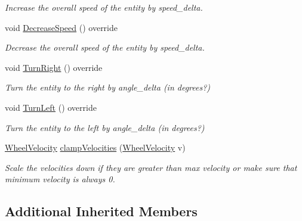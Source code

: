 \begin{DoxyCompactItemize}
\begin{DoxyCompactList}\small\item\em Increase the overall speed of the entity by speed\+\_\+delta. \end{DoxyCompactList}\item 
void \hyperlink{classMotionHandlerRobot_a89e9b8b4e22fb021d7d67c817e66b7b2}{Decrease\+Speed} () override\hypertarget{classMotionHandlerRobot_a89e9b8b4e22fb021d7d67c817e66b7b2}{}\label{classMotionHandlerRobot_a89e9b8b4e22fb021d7d67c817e66b7b2}

\begin{DoxyCompactList}\small\item\em Decrease the overall speed of the entity by speed\+\_\+delta. \end{DoxyCompactList}\item 
void \hyperlink{classMotionHandlerRobot_a4b18204b7c7f7f8a3cbb7f0e8ccf088f}{Turn\+Right} () override\hypertarget{classMotionHandlerRobot_a4b18204b7c7f7f8a3cbb7f0e8ccf088f}{}\label{classMotionHandlerRobot_a4b18204b7c7f7f8a3cbb7f0e8ccf088f}

\begin{DoxyCompactList}\small\item\em Turn the entity to the right by angle\+\_\+delta (in degrees?) \end{DoxyCompactList}\item 
void \hyperlink{classMotionHandlerRobot_a955ca2693c4188ffb08cfde469e58252}{Turn\+Left} () override\hypertarget{classMotionHandlerRobot_a955ca2693c4188ffb08cfde469e58252}{}\label{classMotionHandlerRobot_a955ca2693c4188ffb08cfde469e58252}

\begin{DoxyCompactList}\small\item\em Turn the entity to the left by angle\+\_\+delta (in degrees?) \end{DoxyCompactList}\item 
\hyperlink{structWheelVelocity}{Wheel\+Velocity} \hyperlink{classMotionHandlerRobot_a1d7bb84a42c051104c0981ed3f501c60}{clamp\+Velocities} (\hyperlink{structWheelVelocity}{Wheel\+Velocity} v)
\begin{DoxyCompactList}\small\item\em Scale the velocities down if they are greater than max velocity or make sure that minimum velocity is always 0. \end{DoxyCompactList}\end{DoxyCompactItemize}
\subsection*{Additional Inherited Members}


